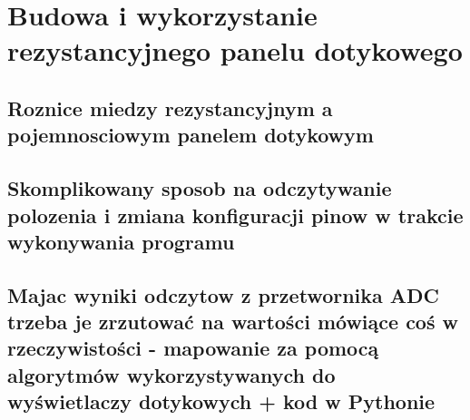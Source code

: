 \newpage %
\section{Budowa i wykorzystanie rezystancyjnego panelu dotykowego}

\subsection{Roznice miedzy rezystancyjnym a pojemnosciowym panelem dotykowym}

\subsection{Skomplikowany sposob na odczytywanie polozenia i zmiana konfiguracji pinow w trakcie wykonywania programu}

\subsection{Majac wyniki odczytow z przetwornika ADC trzeba je zrzutować na wartości mówiące coś w rzeczywistości - mapowanie za pomocą algorytmów wykorzystywanych do wyświetlaczy dotykowych + kod w Pythonie}
